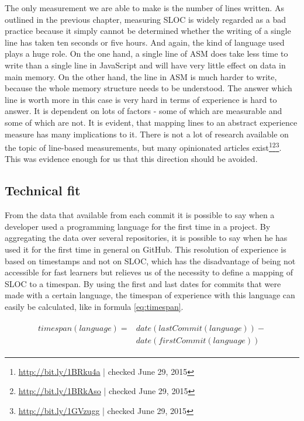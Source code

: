 The only measurement we are able to make is the number of lines written. As outlined in the previous chapter, measuring SLOC is widely regarded as a bad practice because it simply cannot be determined whether the writing of a single line has taken ten seconds or five hours. And again, the kind of language used plays a huge role. On the one hand, a single line of ASM does take less time to write than a single line in JavaScript and will have very little effect on data in main memory. On the other hand, the line in ASM is much harder to write, because the whole memory structure needs to be understood. The answer which line is worth more in this case is very hard in terms of experience is hard to answer. It is dependent on lots of factors - some of which are measurable and some of which are not. It is evident, that mapping lines to an abstract experience measure has many implications to it. There is not a lot of research available on the topic of line-based measurements, but many opinionated articles exist\cite{mlya:2012}\footnote{\url{http://bit.ly/1BRku4a} | checked June 29, 2015}\footnote{\url{http://bit.ly/1BRkAso} | checked June 29, 2015}\footnote{\url{http://bit.ly/1GVzugg} | checked June 29, 2015}. This was evidence enough for us that this direction should be avoided.

\subsection{Technical fit}\label{sec:technicalfit}
From the data that available from each commit it is possible to say when a developer used a programming language for the first time in a project. By aggregating the data over several repositories, it is possible to say when he has used it for the first time in general on GitHub. This resolution of experience is based on timestamps and not on SLOC, which has the disadvantage of being not accessible for fast learners but relieves us of the necessity to define a mapping of SLOC to a timespan. By using the first and last dates for commits that were made with a certain language, the timespan of experience with this language can easily be calculated, like in formula \ref{eq:timespan}.

\begin{align}
\begin{split}\label{eq:timespan}
timespan(language) ={}& date(lastCommit(language)) - \\
                      & date(firstCommit(language))
\end{split}
\end{align}


